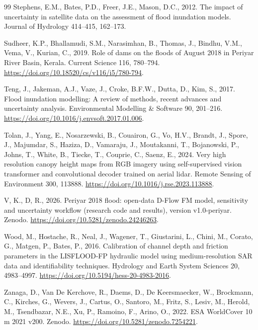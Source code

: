 \documentclass[preprint,12pt,authoryear]{elsarticle}
\begin{document}
\begin{thebibliography}{99}
Stephens, E.M., Bates, P.D., Freer, J.E., Mason, D.C., 2012. The impact of uncertainty in satellite data on the assessment of flood inundation models. Journal of Hydrology 414--415, 162--173.

Sudheer, K.P., Bhallamudi, S.M., Narasimhan, B., Thomas, J., Bindhu, V.M., Vema, V., Kurian, C., 2019. Role of dams on the floods of August 2018 in Periyar River Basin, Kerala. Current Science 116, 780--794. \url{https://doi.org/10.18520/cs/v116/i5/780-794}.

Teng, J., Jakeman, A.J., Vaze, J., Croke, B.F.W., Dutta, D., Kim, S., 2017. Flood inundation modelling: A review of methods, recent advances and uncertainty analysis. Environmental Modelling \& Software 90, 201--216. \url{https://doi.org/10.1016/j.envsoft.2017.01.006}.

Tolan, J., Yang, E., Nosarzewski, B., Couairon, G., Vo, H.V., Brandt, J., Spore, J., Majumdar, S., Haziza, D., Vamaraju, J., Moutakanni, T., Bojanowski, P., Johns, T., White, B., Tiecke, T., Couprie, C., Saenz, E., 2024. Very high resolution canopy height maps from {RGB} imagery using self-supervised vision transformer and convolutional decoder trained on aerial lidar. Remote Sensing of Environment 300, 113888. \url{https://doi.org/10.1016/j.rse.2023.113888}.

V, K., D, R., 2026. Periyar 2018 flood: open-data D-Flow FM model, sensitivity and uncertainty workflow (research code and results), version v1.0-periyar. Zenodo. \url{https://doi.org/10.5281/zenodo.24246263}.

Wood, M., Hostache, R., Neal, J., Wagener, T., Giustarini, L., Chini, M., Corato, G., Matgen, P., Bates, P., 2016. Calibration of channel depth and friction parameters in the LISFLOOD-FP hydraulic model using medium-resolution SAR data and identifiability techniques. Hydrology and Earth System Sciences 20, 4983--4997. \url{https://doi.org/10.5194/hess-20-4983-2016}.

Zanaga, D., Van De Kerchove, R., Daems, D., De Keersmaecker, W., Brockmann, C., Kirches, G., Wevers, J., Cartus, O., Santoro, M., Fritz, S., Lesiv, M., Herold, M., Tsendbazar, N.E., Xu, P., Ramoino, F., Arino, O., 2022. {ESA} {WorldCover} 10 m 2021 v200. Zenodo. \url{https://doi.org/10.5281/zenodo.7254221}.

\end{thebibliography}
\end{document}
